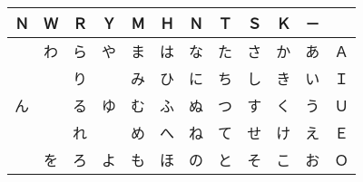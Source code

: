 \begin{center}
\begin{tabular}{|c|cccccccccc|c|}
\hline
Ｎ & Ｗ & Ｒ & Ｙ & Ｍ & Ｈ & Ｎ & Ｔ & Ｓ & Ｋ & － & 　 \\\hline
　 & わ & ら & や & ま & は & な & た & さ & か & あ & Ａ \\
　 & 　 & り & 　 & み & ひ & に & ち & し & き & い & Ｉ \\
ん & 　 & る & ゆ & む & ふ & ぬ & つ & す & く & う & Ｕ \\
　 & 　 & れ & 　 & め & へ & ね & て & せ & け & え & Ｅ \\
　 & を & ろ & よ & も & ほ & の & と & そ & こ & お & Ｏ \\
\hline
\end{tabular}
\end{center}
